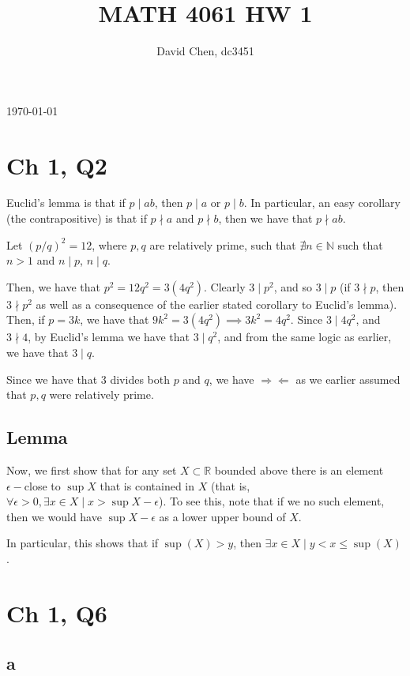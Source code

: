 \documentclass[12pt,letterpaper]{article}
\title{MATH 4061 HW 1}
\author{David Chen, dc3451}
\theoremstyle{definition}
\newcommand{\contra}{\Rightarrow\!\Leftarrow}
\newcommand{\R}{\mathbb{R}}
\newcommand{\N}{\mathbb{N}}
\begin{document}
\maketitle
\today

\section*{Ch 1, Q2}

Euclid's lemma is that if $p \mid ab$, then $p \mid a$ or $p \mid b$. In
particular, an easy corollary (the contrapositive) is that if $p \nmid a$ and $p \nmid b$, then
we have that $p \nmid ab$.

Let $(p / q)^2 = 12$, where $p,q$ are relatively prime, such that $\nexists n \in \N$ such that $n > 1$
and $n \mid p$, $n \mid q$. 

Then, we have that $p^2 = 12q^2 = 3(4q^2)$. Clearly $3 \mid p^2$, and so $3 \mid
p$ (if $3 \nmid p$, then $3 \nmid p^2$ as well as a consequence of the earlier
stated corollary to Euclid's lemma). Then, if $p = 3k$, we have that
$9k^2 = 3(4q^2) \implies 3k^2 = 4q^2$. Since $3 \mid 4q^2$, and $3 \nmid 4$, by
Euclid's lemma we have that $3 \mid q^2$, and from the same logic as earlier, we
have that $3 \mid q$. 

Since we have that 3 divides both $p$ and $q$, we have $\contra$ as we earlier
assumed that $p, q$ were relatively prime.

\subsection*{Lemma}

Now, we first show that for any set $X \subset \R$ bounded above there is an element
$\epsilon-$close to $\sup X$ that is contained in $X$ (that is, $\forall \epsilon
> 0, \exists x \in X
\mid x > \sup X - \epsilon$). To see this, note that if
we no such element, then we would have $\sup X - \epsilon$ as a lower upper
bound of $X$.

In particular, this shows that if $\sup(X) > y$, then $\exists x \in X \mid y <
x \leq \sup(X)$.

\section*{Ch 1, Q6}

\subsection*{a}
\end{document}
